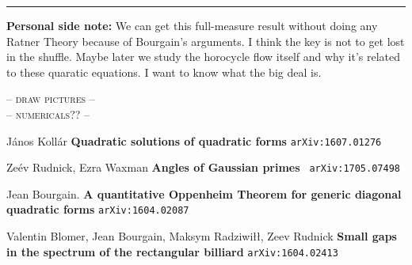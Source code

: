 \documentclass[12pt]{article}
\begin{document}
\vfill

\hrule \vspace{6pt}

\noindent \textbf{Personal side note:} We can get this full-measure result without doing any Ratner Theory because of Bourgain's arguments.  I think the key is not to get lost in the shuffle.  Maybe later we study the horocycle flow itself and why it's related to these quaratic equations.  I want to know what the big deal is.

\newpage

\noindent -- \textsc{draw pictures} -- \\ -- \textsc{numericals??} --


\begin{thebibliography}{}

\item J\'{a}nos Koll\'{a}r \textbf{Quadratic solutions of quadratic forms} \texttt{arXiv:1607.01276}

\item Ze\'{e}v Rudnick, Ezra Waxman  \textbf{Angles of Gaussian primes} \texttt{ arXiv:1705.07498}

\item Jean Bourgain. \textbf{A quantitative Oppenheim Theorem for generic diagonal quadratic forms} \texttt{arXiv:1604.02087}

\item Valentin Blomer, Jean Bourgain, Maksym Radziwi\l\l, Zeev Rudnick   \textbf{Small gaps in the spectrum of the rectangular billiard} \texttt{arXiv:1604.02413}


\end{thebibliography}



\vfill
\end{document}
